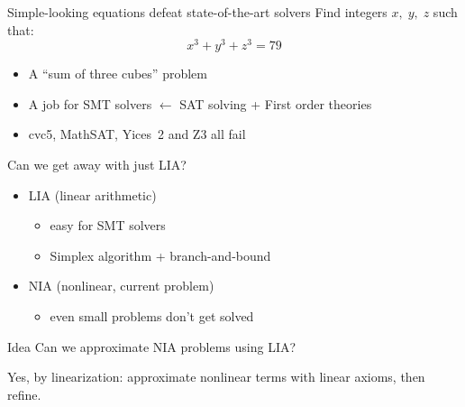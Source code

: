 \documentclass[11pt]{beamer}
\begin{document}
\begin{frame}{Simple-looking equations defeat state-of-the-art solvers}
	Find integers $x,\;y,\;z$ such that:
	\[
		x^3 + y^3 + z^3 = 79
	\]
	\begin{itemize}
		\item A ``sum of three cubes'' problem
		\item A job for \alert{SMT solvers} $\leftarrow$ SAT solving + First order theories
		\item cvc5, MathSAT, Yices~2 and Z3 all fail
	\end{itemize}
\end{frame}

\begin{frame}{Can we get away with just LIA?}
	\begin{itemize}
		\item \alert{LIA} (linear arithmetic)
		      \begin{itemize}
			      \item easy for SMT solvers
			      \item Simplex algorithm + branch-and-bound
		      \end{itemize}
		\item \alert{NIA} (nonlinear, current problem)
		      \begin{itemize}
			      \item even small problems don't get solved
		      \end{itemize}
	\end{itemize}
	\begin{block}{Idea}
		Can we approximate NIA problems using LIA?
	\end{block}
	\pause
	Yes, by \alert{linearization}: approximate nonlinear terms with linear
	axioms, then refine.
\end{frame}

\end{document}
